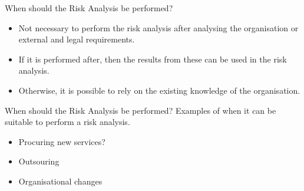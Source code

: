 \documentclass{beamer}
\begin{document}
\begin{frame}{When should the Risk Analysis be performed?}
  \begin{itemize}
    \item Not necessary to perform the risk analysis after analysing the
      organisation or external and legal requirements.
    \item If it is performed after, then the results from these can be used in
      the risk analysis.
    \item Otherwise, it is possible to rely on the existing knowledge of the
      organisation.
  \end{itemize}
\end{frame}
\begin{frame}{When should the Risk Analysis be performed?}
  Examples of when it can be suitable to perform a risk analysis.
  \begin{itemize}
    \item Procuring new services?
    \item Outsouring
    \item Organisational changes
  \end{itemize}
\end{frame}
\end{document}
